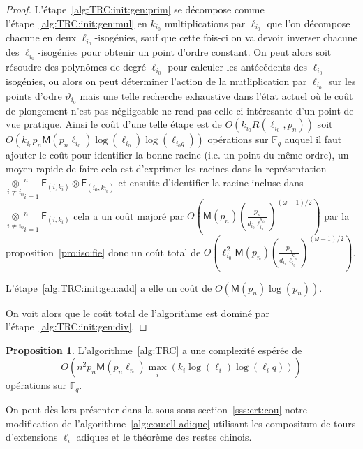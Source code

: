 \documentclass[10pt,a4paper]{book}
\theoremstyle{plain}
\theoremstyle{definition}
\theoremstyle{definition}
\theoremstyle{definition}
\newtheorem{prop}[thm]{Proposition}
\theoremstyle{definition}
\theoremstyle{remark}
\theoremstyle{remark}
\theoremstyle{definition}
\begin{document}
\begin{proof}
L'étape~\ref{alg:TRC:init:gen:prim} se décompose comme 
l'étape~\ref{alg:TRC:init:gen:mul} en $k_{i_0}$ multiplications par 
$\ell_{i_0}$ que l'on décompose chacune en deux $\ell_{i_0}$-isogénies, sauf 
que cette fois-ci on va devoir inverser chacune des $\ell_{i_0}$-isogénies pour
obtenir un point d'ordre constant. On peut alors soit résoudre des polynômes de
degré $\ell_{i_0}$ pour calculer les antécédents des $\ell_{i_0}$-isogénies, ou
alors on peut déterminer l'action de la mutliplication par $\ell_{i_0}$ sur les
points d'odre $\vartheta_{i_0}$ mais une telle recherche exhaustive dans l'état
actuel où le coût de plongement n'est pas négligeable ne rend pas celle-ci 
intéresante d'un point de vue pratique. Ainsi le coût d'une telle étape est de 
$O(k_{i_0}R(\ell_{i_0},p_n))$ soit $O(k_{i_0}p_n\mathsf{M}(p_n\ell_{i_0})
\log(\ell_{i_0})\log(\ell_{i_0q}))$ opérations sur $\mathbb{F}_q$ auquel il 
faut ajouter le coût pour identifier la bonne racine (i.e. un point du même 
ordre), un moyen rapide de faire cela est d'exprimer les racines dans la 
représentation $\underset{i\neq i_0}\otimes_{i=1}^n \mathsf{F}_{(i,k_i)} 
\otimes \mathsf{F}_{(i_0,k_{i_0})}$ et ensuite d'identifier la racine incluse
dans $\underset{i\neq i_0}\otimes_{i=1}^n \mathsf{F}_{(i,k_i)}$ cela a un coût 
majoré par 
$O(\mathsf{M}(p_n)(\frac{p_n}{d_{i_0}\ell_{i_0}^{k_{i_0}}})^{(\omega-1)/2})$ 
par la proposition~\ref{pro:iso:fie} donc un coût total de 
$O(\ell_{i_0}^2\mathsf{M}(p_n)(\frac{p_n}{d_{i_0}\ell_{i_0}^{k_{i_0}}})^{(\omega-1)/2})$.

L'étape~\ref{alg:TRC:init:gen:add} a elle un coût de $O(\mathsf{M}(p_n)\log(p_n))$.

On voit alors que le coût total de l'algorithme est dominé par 
l'étape~\ref{alg:TRC:init:gen:div}.
\end{proof}

\begin{prop}
L'algorithme~\ref{alg:TRC} a une complexité espérée de 
\[
O(n^2 p_{n}\mathsf{M}(p_{n}\ell_{n})\max_i(k_i\log(\ell_{i})\log(\ell_{i}q))) 
\]
opérations sur $\mathbb{F}_q$.
\end{prop}

On peut dès lors présenter dans la sous-sous-section~\ref{sss:crt:cou} notre 
modification de l'algorithme~\ref{alg:cou:ell-adique} utilisant les compositum 
de tours d'extensions $\ell_i$ adiques et le théorème des restes chinois.
\end{document}
